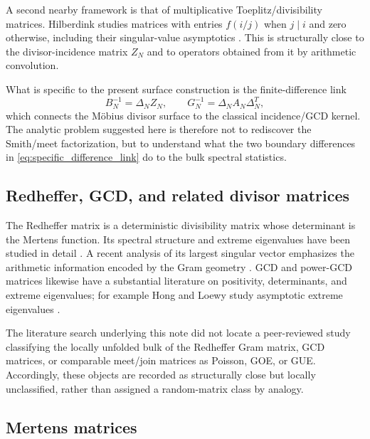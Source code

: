 \documentclass[11pt]{amsart}
\numberwithin{equation}{section}
\theoremstyle{plain}
\theoremstyle{definition}
\theoremstyle{remark}
\begin{document}
A second nearby framework is that of multiplicative Toeplitz/divisibility matrices.  Hilberdink studies matrices with entries $f(i/j)$ when $j\mid i$ and zero otherwise, including their singular-value asymptotics \cite{Hilberdink2017}.  This is structurally close to the divisor-incidence matrix $Z_N$ and to operators obtained from it by arithmetic convolution.

What is specific to the present surface construction is the finite-difference link
\begin{equation}
B_N^{-1}=\Delta_NZ_N,
\qquad
G_N^{-1}=\Delta_NA_N\Delta_N^T,
\label{eq:specific_difference_link}
\end{equation}
which connects the M\"obius divisor surface to the classical incidence/GCD kernel.  The analytic problem suggested here is therefore not to rediscover the Smith/meet factorization, but to understand what the two boundary differences in \eqref{eq:specific_difference_link} do to the bulk spectral statistics.

\subsection{Redheffer, GCD, and related divisor matrices}
\label{subsec:redheffer_gcd}

The Redheffer matrix is a deterministic divisibility matrix whose determinant is the Mertens function.  Its spectral structure and extreme eigenvalues have been studied in detail \cite{BarrettJarvis1992}.  A recent analysis of its largest singular vector emphasizes the arithmetic information encoded by the Gram geometry \cite{ClementSteinerberger2025}.  GCD and power-GCD matrices likewise have a substantial literature on positivity, determinants, and extreme eigenvalues; for example Hong and Loewy study asymptotic extreme eigenvalues \cite{HongLoewy2004}.

The literature search underlying this note did not locate a peer-reviewed study classifying the locally unfolded bulk of the Redheffer Gram matrix, GCD matrices, or comparable meet/join matrices as Poisson, GOE, or GUE.  Accordingly, these objects are recorded as structurally close but locally unclassified, rather than assigned a random-matrix class by analogy.

\subsection{Mertens matrices}
\label{subsec:mertens_matrices}
\end{document}
